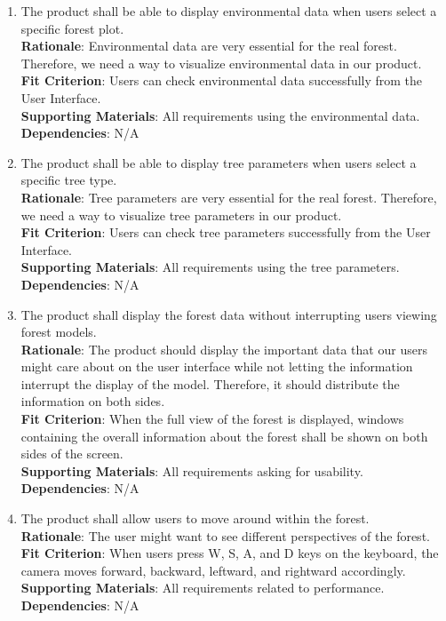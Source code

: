 \documentclass{article}
\begin{document}
\begin{enumerate}[FR1]
\item The product shall be able to display 
environmental data when users select a specific forest plot.\\
\textbf{Rationale}: Environmental data are very essential for the real forest.
Therefore, we need a way to visualize environmental data in our product.\\
\textbf{Fit Criterion}: Users can check environmental data successfully from
the User Interface.\\
\textbf{Supporting Materials}: All requirements using the environmental data.\\
\textbf{Dependencies}: N/A\\

\item The product shall be able to display tree parameters
when users select a specific tree type.\\
\textbf{Rationale}: Tree parameters are very essential for the real forest.
Therefore, we need a way to visualize tree parameters in our product.\\
\textbf{Fit Criterion}: Users can check tree parameters successfully from
the User Interface.\\
\textbf{Supporting Materials}: All requirements using the tree parameters.\\
\textbf{Dependencies}: N/A\\

\item The product shall display the forest data 
 without interrupting users viewing forest models.\\
\textbf{Rationale}: The product should display the important data that our users
might care about on the user interface while not letting the information interrupt
the display of the model. Therefore, it should distribute the information on both
sides.\\
\textbf{Fit Criterion}: When the full view of the forest is displayed, windows 
containing the overall information about the forest shall be shown on both sides
of the screen. \\
\textbf{Supporting Materials}: All requirements asking for usability.\\
\textbf{Dependencies}: N/A\\

\item The product shall allow users to move around within the forest.\\
\textbf{Rationale}: The user might want to see different perspectives of the 
forest. \\
\textbf{Fit Criterion}: When users press W, S, A, and D keys on the keyboard, the 
camera moves forward, backward, leftward, and rightward accordingly.  \\
\textbf{Supporting Materials}: All requirements related to performance.\\
\textbf{Dependencies}: N/A\\
	

\end{enumerate}
\end{document}
